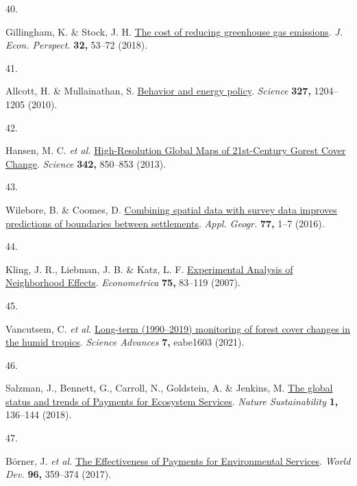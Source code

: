 \documentclass[
]{article}
\newlength{\cslhangindent}
\newlength{\csllabelwidth}
\newlength{\cslentryspacingunit} %
\newenvironment{CSLReferences}[2] %
 {%
  \setlength{\parindent}{0pt}
  \ifodd #1
  \let\oldpar\par
  \def\par{\hangindent=\cslhangindent\oldpar}
  \fi
  \setlength{\parskip}{#2\cslentryspacingunit}
 }%
 {}
\newcommand{\CSLLeftMargin}[1]{\parbox[t]{\csllabelwidth}{#1}}
\newcommand{\CSLRightInline}[1]{\parbox[t]{\linewidth - \csllabelwidth}{#1}\break}
\begin{document}
\begin{CSLReferences}{0}{0}
\leavevmode{}%
\CSLLeftMargin{40. }%
\CSLRightInline{Gillingham, K. \& Stock, J. H.
\href{https://doi.org/10.1257/jep.32.4.53}{{The cost of reducing
greenhouse gas emissions}}. \emph{J. Econ. Perspect.} \textbf{32,}
53--72 (2018).}

\leavevmode{}%
\CSLLeftMargin{41. }%
\CSLRightInline{Allcott, H. \& Mullainathan, S.
\href{https://doi.org/10.1126/science.1180775}{{Behavior and energy
policy}}. \emph{Science} \textbf{327,} 1204--1205 (2010).}

\leavevmode{}%
\CSLLeftMargin{42. }%
\CSLRightInline{Hansen, M. C. \emph{et al.}
\href{https://doi.org/10.1126/science.1244693}{{High-Resolution Global
Maps of 21st-Century Gorest Cover Change}}. \emph{Science} \textbf{342,}
850--853 (2013).}

\leavevmode{}%
\CSLLeftMargin{43. }%
\CSLRightInline{Wilebore, B. \& Coomes, D.
\href{https://doi.org/10.1016/J.APGEOG.2016.09.007}{{Combining spatial
data with survey data improves predictions of boundaries between
settlements}}. \emph{Appl. Geogr.} \textbf{77,} 1--7 (2016).}

\leavevmode{}%
\CSLLeftMargin{44. }%
\CSLRightInline{Kling, J. R., Liebman, J. B. \& Katz, L. F.
\href{https://doi.org/10.1111/j.1468-0262.2007.00733.x}{{Experimental
Analysis of Neighborhood Effects}}. \emph{Econometrica} \textbf{75,}
83--119 (2007).}

\leavevmode{}%
\CSLLeftMargin{45. }%
\CSLRightInline{Vancutsem, C. \emph{et al.}
\href{https://doi.org/10.1126/sciadv.abe1603}{{Long-term (1990--2019)
monitoring of forest cover changes in the humid tropics}}. \emph{Science
Advances} \textbf{7,} eabe1603 (2021).}

\leavevmode{}%
\CSLLeftMargin{46. }%
\CSLRightInline{Salzman, J., Bennett, G., Carroll, N., Goldstein, A. \&
Jenkins, M. \href{https://doi.org/10.1038/s41893-018-0033-0}{{The global
status and trends of Payments for Ecosystem Services}}. \emph{Nature
Sustainability} \textbf{1,} 136--144 (2018).}

\leavevmode{}%
\CSLLeftMargin{47. }%
\CSLRightInline{Börner, J. \emph{et al.}
\href{https://doi.org/10.1016/j.worlddev.2017.03.020}{{The Effectiveness
of Payments for Environmental Services}}. \emph{World Dev.} \textbf{96,}
359--374 (2017).}


\end{CSLReferences}
\end{document}
